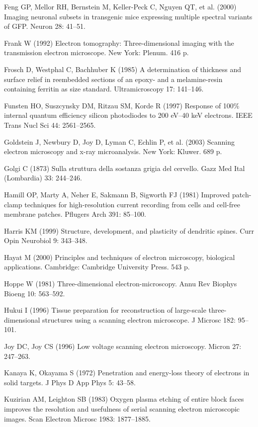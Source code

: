 \documentclass{article}
\begin{document}
\begin{hangpars}
Feng GP, Mellor RH, Bernstein M, Keller-Peck C, Nguyen QT, et al. (2000) Imaging neuronal subsets in transgenic mice expressing multiple spectral variants of GFP. Neuron 28: 41–51.

Frank W (1992) Electron tomography: Three-dimensional imaging with the transmission electron microscope. New York: Plenum. 416 p.

Frosch D, Westphal C, Bachhuber K (1985) A determination of thickness and surface relief in reembedded sections of an epoxy- and a melamine-resin containing ferritin as size standard. Ultramicroscopy 17: 141–146.

Funsten HO, Suszcynsky DM, Ritzau SM, Korde R (1997) Response of 100\% internal quantum efficiency silicon photodiodes to 200 eV–40 keV electrons. IEEE Trans Nucl Sci 44: 2561–2565.

Goldstein J, Newbury D, Joy D, Lyman C, Echlin P, et al. (2003) Scanning electron microscopy and x-ray microanalysis. New York: Kluwer. 689 p.

Golgi C (1873) Sulla struttura della sostanza grigia del cervello. Gazz Med Ital (Lombardia) 33: 244–246.

Hamill OP, Marty A, Neher E, Sakmann B, Sigworth FJ (1981) Improved patch-clamp techniques for high-resolution current recording from cells and cell-free membrane patches. Pflugers Arch 391: 85–100.

Harris KM (1999) Structure, development, and plasticity of dendritic spines. Curr Opin Neurobiol 9: 343–348.

Hayat M (2000) Principles and techniques of electron microscopy, biological applications. Cambridge: Cambridge University Press. 543 p.

Hoppe W (1981) Three-dimensional electron-microscopy. Annu Rev Biophys Bioeng 10: 563–592.

Hukui I (1996) Tissue preparation for reconstruction of large-scale three-dimensional structures using a scanning electron microscope. J Microsc 182: 95–101.

Joy DC, Joy CS (1996) Low voltage scanning electron microscopy. Micron 27: 247–263.

Kanaya K, Okayama S (1972) Penetration and energy-loss theory of electrons in solid targets. J Phys D App Phys 5: 43–58.

Kuzirian AM, Leighton SB (1983) Oxygen plasma etching of entire block faces improves the resolution and usefulness of serial scanning electron microscopic images. Scan Electron Microsc 1983: 1877–1885.


\end{hangpars}
\end{document}
